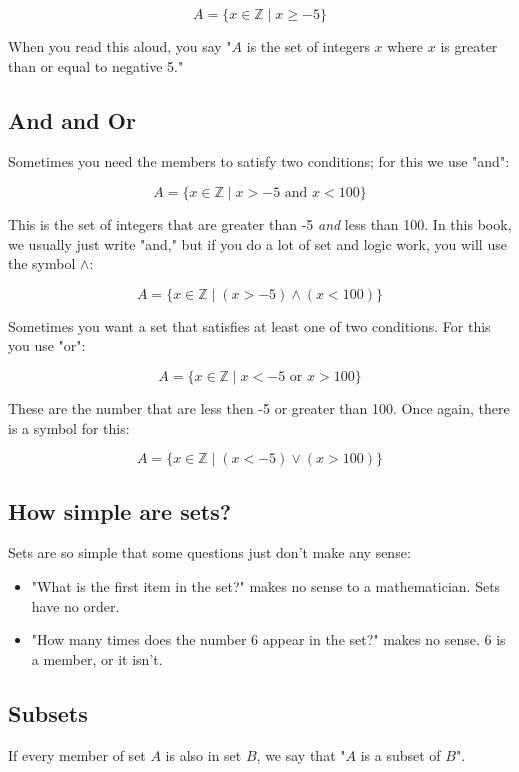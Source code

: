 $$A = \{ x \in \mathbb{Z} \mid x \geq -5 \}$$

When you read this aloud, you say "$A$ is the set of integers $x$
where $x$ is greater than or equal to negative 5."

\subsection{And and Or}

Sometimes you need the members to satisfy two conditions; for this we
use "and": 

$$A = \{ x \in \mathbb{Z} \mid x > -5 \text{ and }  x < 100\}$$

This is the set of integers that are greater than -5 \textit{and} less
than 100.  In this book, we usually just write "and," but if you do a
lot of set and logic work, you will use the symbol $\land$:

$$A = \{ x \in \mathbb{Z} \mid (x > -5) \land (x < 100)\}$$

Sometimes you want a set that satisfies at least one of two
conditions.  For this you use "or":

$$A = \{ x \in \mathbb{Z} \mid x < -5 \text{ or } x > 100\}$$

These are the number that are less then -5 or greater than 100.  Once
again, there is a symbol for this:

$$A = \{ x \in \mathbb{Z} \mid (x < -5) \lor (x > 100)\}$$

\subsection{How simple are sets?}

Sets are so simple that some questions just don't make any sense:
\begin{itemize}
\item "What is the first item in the set?" makes no sense to a mathematician.  Sets have no order.
\item "How many times does the number 6 appear in the set?"  makes no sense.   6 is a member, or it isn't.   
\end{itemize}

\subsection{Subsets}

If every member of set $A$ is also in set $B$, we say that "$A$ is a
subset of $B$". 


